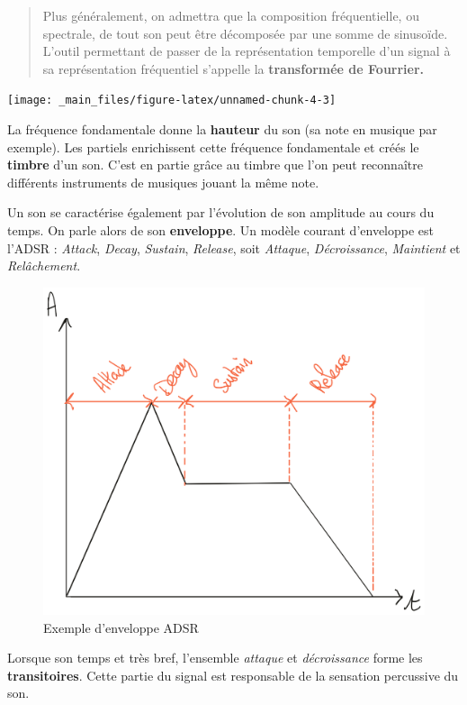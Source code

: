 \documentclass[
]{book}
\begin{document}
\begin{quote}
Plus généralement, on admettra que la composition fréquentielle, ou spectrale, de tout son peut être décomposée par une somme de sinusoïde. L'outil permettant de passer de la représentation temporelle d'un signal à sa représentation fréquentiel s'appelle la \textbf{transformée de Fourrier.}
\end{quote}

\begin{center}\texttt{[image: \_main\_files/figure-latex/unnamed-chunk-4-3]} \end{center}

La fréquence fondamentale donne la \textbf{hauteur} du son (sa note en musique par exemple). Les partiels enrichissent cette fréquence fondamentale et créés le \textbf{timbre} d'un son. C'est en partie grâce au timbre que l'on peut reconnaître différents instruments de musiques jouant la même note.

Un son se caractérise également par l'évolution de son amplitude au cours du temps. On parle alors de son \textbf{enveloppe}. Un modèle courant d'enveloppe est l'ADSR : \emph{Attack}, \emph{Decay}, \emph{Sustain}, \emph{Release}, soit \emph{Attaque}, \emph{Décroissance}, \emph{Maintient} et \emph{Relâchement}.

\begin{figure}

{\centering \includegraphics[width=0.65\linewidth]{_resources/drawings/adsr} 

}

\caption{Exemple d'enveloppe ADSR}\label{fig:unnamed-chunk-5}
\end{figure}

Lorsque son temps et très bref, l'ensemble \emph{attaque} et \emph{décroissance} forme les \textbf{transitoires}. Cette partie du signal est responsable de la sensation percussive du son.
\end{document}

